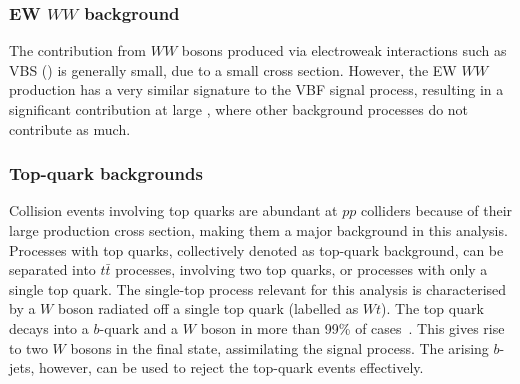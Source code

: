 \subsubsection{EW $WW$ background}
The contribution from $WW$ bosons produced via electroweak interactions such as VBS () is generally small, due to a small cross section. However, the EW $WW$ production has a very similar signature to the VBF signal process, resulting in a significant contribution at large \mjj, where other background processes do not contribute as much. 

\subsubsection{Top-quark backgrounds}
Collision events involving top quarks are abundant at $pp$ colliders because of their large production cross section, making them a major background in this analysis.
Processes with top quarks, collectively denoted as top-quark background, can be separated into $t\bar{t}$ processes, involving two top quarks, or processes with only a single top quark. 
The single-top process relevant for this analysis is characterised by a $W$ boson radiated off a single top quark (labelled as $Wt$). 
The top quark decays into a $b$-quark and a $W$ boson in more than 99\% of cases~\cite{PDG2020}. 
This gives rise to two $W$ bosons in the final state, assimilating the signal process. 
The arising $b$-jets, however, can be used to reject the top-quark events effectively.

